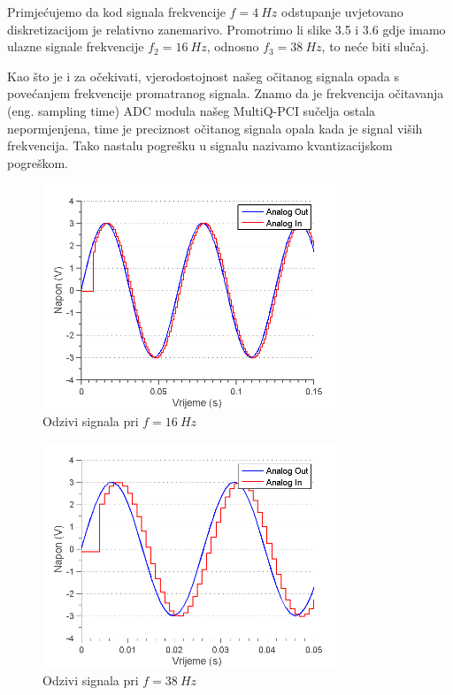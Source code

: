 \documentclass[12pt,a4paper]{article}
\begin{document}
Primjećujemo da kod signala frekvencije $f=4\ Hz$ odstupanje uvjetovano diskretizacijom je relativno zanemarivo. Promotrimo li slike 3.5 i 3.6 gdje imamo ulazne signale frekvencije $f_2=16\ Hz$, odnosno $f_3=38\ Hz$, to neće biti slučaj.\newline

Kao što je i za očekivati, vjerodostojnost našeg očitanog signala opada s povećanjem frekvencije promatranog signala. Znamo da je frekvencija očitavanja (eng. sampling time) ADC modula našeg MultiQ-PCI sučelja ostala nepormjenjena, time je preciznost očitanog signala opala kada je signal viših frekvencija. Tako nastalu pogrešku u signalu nazivamo kvantizacijskom pogreškom.\newline

\newpage
\begin{figure}[!ht]
	\begin{center}
	\includegraphics[width=0.8\textwidth] {prvi16.png}
    \caption{Odzivi signala pri $f=16\ Hz$}
    \end{center}
\end{figure}


\begin{figure}[!ht]
	\begin{center}
	\includegraphics[width=0.8\textwidth] {prvi38.png}
    \caption{Odzivi signala pri $f=38\ Hz$}
    \end{center}
\end{figure}
\end{document}
